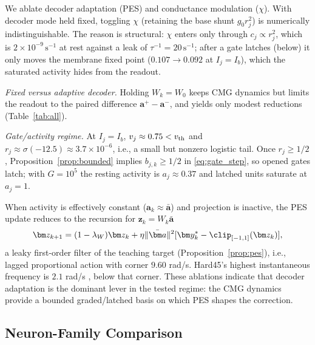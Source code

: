 We ablate decoder adaptation (PES) and conductance modulation ($\chi$). With decoder mode held fixed, toggling $\chi$ (retaining the base shunt $g_0r_j^2$) is numerically indistinguishable. The reason is structural: $\chi$ enters only through $c_j\propto r_j^2$, which is $2\times10^{-9}\,\mathrm{s}^{-1}$ at rest against a leak of $\tau^{-1}=20\,\mathrm{s}^{-1}$; after a gate latches (below) it only moves the membrane fixed point ($0.107\to0.092$ at $I_j=I_b$), which the saturated activity hides from the readout.

\emph{Fixed versus adaptive decoder.} Holding $W_k=W_0$ keeps CMG dynamics but limits the readout to the paired difference $\bm a^+-\bm a^-$, and yields only modest reductions (Table~\ref{tab:all}).

\emph{Gate/activity regime.} At $I_j=I_b$, $v_j\approx0.75<v_{\rm th}$ and $r_j\approx\sigma(-12.5)\approx3.7\times10^{-6}$, i.e., a small but nonzero logistic tail. Once $r_j\ge1/2$, Proposition~\ref{prop:bounded} implies $b_{j,k}\ge1/2$ in \eqref{eq:gate_step}, so opened gates latch; with $G=10^5$ the resting activity is $a_j\approx0.37$ and latched units saturate at $a_j=1$.

When activity is effectively constant ($\bm a_k\approx\bar{\bm a}$) and projection is inactive, the PES update reduces to the recursion for $\bm z_k=W_k\bar{\bm a}$
\begin{equation}
 \bm z_{k+1}=(1-\lambda_W)\bm z_k
 +\eta\|\bar{\bm a}\|^2[\bm y_k^*-\clip_{[-1,1]}(\bm z_k)],
 \label{eq:constantbasis}
\end{equation}
a leaky first-order filter of the teaching target (Proposition~\ref{prop:pes}), i.e., lagged proportional action with corner $9.60$ rad/s. Hard45's highest instantaneous frequency is $2.1$ rad/s \cite{sandoval2018instantaneous}, below that corner. These ablations indicate that decoder adaptation is the dominant lever in the tested regime: the CMG dynamics provide a bounded graded/latched basis on which PES shapes the correction.

\subsection{Neuron-Family Comparison}
\label{sec:family}

